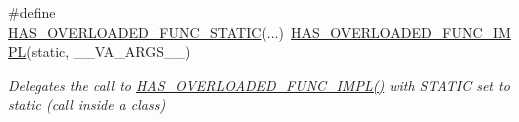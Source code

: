 \begin{DoxyCompactItemize}
\#define \hyperlink{group__HasMemberGroup_gab2fa7474c70aacca62923dcf77719337}{H\+A\+S\+\_\+\+O\+V\+E\+R\+L\+O\+A\+D\+E\+D\+\_\+\+F\+U\+N\+C\+\_\+\+S\+T\+A\+T\+IC}(...)~\hyperlink{group__HasMemberGroup_gaae550ab3ce508ae2feb5fccabcaea0f8}{H\+A\+S\+\_\+\+O\+V\+E\+R\+L\+O\+A\+D\+E\+D\+\_\+\+F\+U\+N\+C\+\_\+\+I\+M\+PL}(static, \+\_\+\+\_\+\+V\+A\+\_\+\+A\+R\+G\+S\+\_\+\+\_\+)
\begin{DoxyCompactList}\small\item\em Delegates the call to \hyperlink{group__HasMemberGroup_gaae550ab3ce508ae2feb5fccabcaea0f8}{H\+A\+S\+\_\+\+O\+V\+E\+R\+L\+O\+A\+D\+E\+D\+\_\+\+F\+U\+N\+C\+\_\+\+I\+M\+P\+L()} with {\ttfamily S\+T\+A\+T\+IC} set to {\ttfamily static} (call inside a class) \end{DoxyCompactList}\end{DoxyCompactItemize}
\label{_amgrp01747264fe7bf50731df0522c351974e}%
